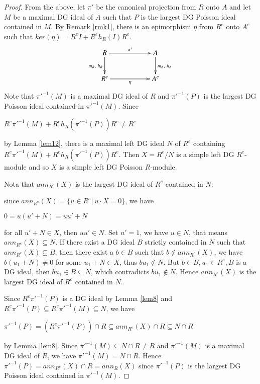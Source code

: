 \documentclass[a4paper,10pt]{amsart}
\theoremstyle{definition}
\theoremstyle{remark}
\numberwithin{equation}{section}
\begin{document}
\begin{proof}
From the above, let $\pi'$ be the canonical projection from $R$ onto
$A$ and let $M$ be a maximal DG ideal of $A$ such that $P$ is the
largest DG Poisson ideal contained in $M$. By Remark \ref{rmk1}, there is
an epimorphism $\eta$ from $R^{e}$ onto $A^e$ such that
$ker(\eta)=R^{e}I+R^{e}h_R(I)R^{e}$.
\begin{eqnarray*}
\xymatrix{
  R \ar[d]_{m_R, ~h_R} \ar[rr]^{\pi'}
          &\      & A \ar[d]^{m_A, ~h_A}  \\
  R^{e} \ar[rr]_{\eta}
           &\     & A^e             }
\end{eqnarray*}
Note that $\pi'^{-1}(M)$ is a maximal DG ideal of $R$ and
$\pi'^{-1}(P)$ is the largest DG Poisson ideal contained in
$\pi'^{-1}(M)$. Since
\begin{center}
$R^{e}\pi'^{-1}(M)+R^{e}h_R(\pi'^{-1}(P))R^{e}\neq R^{e}$
\end{center}
by Lemma \ref{lem12}, there is a maximal left DG ideal $N$ of $R^{e}$
containing $R^{e}\pi'^{-1}(M)+R^{e}h_R(\pi'^{-1}(P))R^{e}$. Then
$X=R^{e}/N$ is a simple left DG $R^{e}$-module and so $X$ is a
simple left DG Poisson $R$-module.

Nota that $ann_{R^{e}}(X)$ is the largest DG ideal of $R^{e}$
contained in $N$:

since $ann_{R^{e}}(X)=\{u\in R^{e} | ~u\cdot X=0\}$, we have
\begin{center}
$0=u(u'+N)=uu'+N$
\end{center}
for all $u'+N\in X$, then $uu'\in N$. Set $u'=1$, we have $u\in N$,
that means $ann_{R^{e}}(X)\subseteq N$. If there exist a DG ideal
$B$ strictly contained in $N$ such that $ann_{R^{e}}(X)\subsetneq
B$, then there exist a $b\in B$ such that $b\notin ann_{R^{e}}(X)$,
we have $b(u_1+N)\neq 0$ for some $u_1+N\in X$, thus $bu_1\notin N$. But $b\in B, u_1\in R^{e}, B$ is a DG ideal, then $bu_1\in B\subseteq N$, which contradicts $bu_1\notin
N$. Hence $ann_{R^{e}}(X)$ is the largest DG ideal of $R^{e}$
contained in $N$.

Since $R^{e}\pi'^{-1}(P)$ is a DG ideal by Lemma \ref{lem8} and
$R^{e}\pi'^{-1}(P)\subseteq R^{e}\pi'^{-1}(M)\subseteq N$, we have
\begin{center}
$\pi'^{-1}(P)=(R^{e}\pi'^{-1}(P))\cap R\subseteq ann_{R^{e}}(X)\cap
R\subseteq N\cap R$
\end{center}
by Lemma \ref{lem8}. Since $\pi'^{-1}(M)\subseteq N\cap R\neq R$ and
$\pi'^{-1}(M)$ is a maximal DG ideal of $R$, we have
$\pi'^{-1}(M)=N\cap R$. Hence $\pi'^{-1}(P)=ann_{R^{e}}(X)\cap
R=ann_{R}(X)$ since $\pi'^{-1}(P)$ is the largest DG Poisson ideal
contained in $\pi'^{-1}(M)$.


\end{proof}
\end{document}
